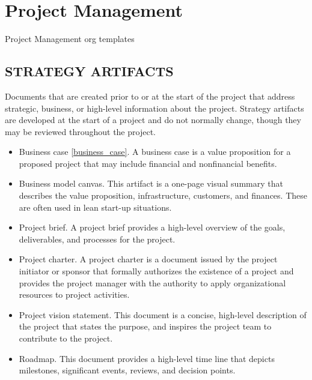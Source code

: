 \documentclass[11pt]{article}
\author{Ricardo Antunes}
\date{\today}
\title{}
\begin{document}
\tableofcontents

\section{Project Management}
\label{sec:org5f1320a}
Project Management org templates

\subsection{STRATEGY ARTIFACTS}
\label{sec:org744a925}
Documents that are created prior to or at the start of the project that address strategic, business, or high-level information about the project. Strategy artifacts are developed at the start of a project and do not normally change, though they may be reviewed throughout the project.
\begin{itemize}
\item Business case \ref{business_case}. A business case is a value proposition for a proposed project that may include financial and nonfinancial benefits.
\item Business model canvas. This artifact is a one-page visual summary that describes the value proposition, infrastructure, customers, and finances. These are often used in lean start-up situations.
\item Project brief. A project brief provides a high-level overview of the goals, deliverables, and processes for the project.
\item Project charter. A project charter is a document issued by the project initiator or sponsor that formally authorizes the existence of a project and provides the project manager with the authority to apply organizational resources to project activities.
\item Project vision statement. This document is a concise, high-level description of the project that states the purpose, and inspires the project team to contribute to the project.
\item Roadmap. This document provides a high-level time line that depicts milestones, significant events, reviews, and decision points.
\end{itemize}
\end{document}
